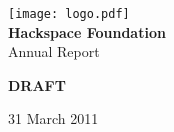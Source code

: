 


\begin{titlepage}
\begin{center}
\texttt{[image: logo.pdf]}\\[48pt]
{\bf \LARGE Hackspace Foundation}\\[36pt]
{\Large Annual Report}

{\bf \LARGE DRAFT}

\vfill
31 March 2011

\end{center}
\end{titlepage}







